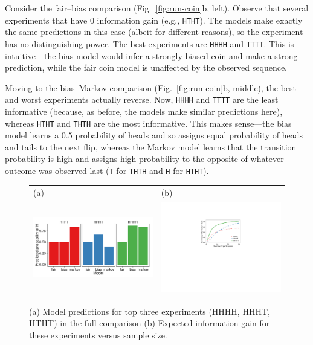 \documentclass{article}
\begin{document}
Consider the fair--bias comparison (Fig.~\ref{fig:run-coin}b, left).
Observe that several experiments that have 0 information gain (e.g., \lstinline{HTHT}).
The models make exactly the same predictions in this case (albeit for different reasons), so the experiment has no distinguishing power.
The best experiments are \lstinline{HHHH} and \lstinline{TTTT}.
This is intuitive---the bias model would infer a strongly biased coin and make a strong prediction, while the fair coin model is unaffected by the observed sequence.

Moving to the bias--Markov comparison (Fig.~\ref{fig:run-coin}b, middle), the best and worst experiments actually reverse.
Now, \lstinline{HHHH} and \lstinline{TTTT} are the least informative (because, as before, the models make similar predictions here), whereas \lstinline{HTHT} and \lstinline{THTH} are the most informative.
This makes sense---the bias model learns a 0.5 probability of heads and so assigns equal probability of heads and tails to the next flip, whereas the Markov model learns that the transition probability is high and assigns high probability to the opposite of whatever outcome was observed last (\lstinline{T} for \lstinline{THTH} and \lstinline{H} for \lstinline{HTHT}).

\begin{figure}[h]
  \centering
  \begin{tabular}{l l}
    (a) & (b)\\
    \includegraphics[width=0.6\columnwidth]{img/coin_predictions.pdf} &
                                                                        \includegraphics[width=0.4\columnwidth]{img/coin_eig_3way_nsubj_wlegend.pdf} \\
  \end{tabular}
  \caption{(a) Model predictions for top three experiments (HHHH, HHHT, HTHT) in the full comparison (b) Expected information gain for these experiments versus sample size.}
  \label{fig:coin_preds}
\end{figure}
\end{document}
